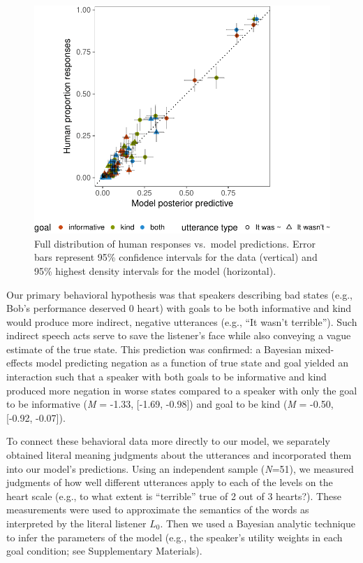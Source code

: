 \documentclass[12pt]{article}
\begin{document}

\begin{figure}
\centering
\includegraphics{polite_manuscript_files/figure-latex/variance-1.pdf}
\caption{\label{fig:variance}Full distribution of human responses vs.~model
predictions. Error bars represent 95\% confidence intervals for the data
(vertical) and 95\% highest density intervals for the model
(horizontal).}
\end{figure}

Our primary behavioral hypothesis was that speakers describing bad
states (e.g., Bob's performance deserved 0 heart) with goals to be both
informative and kind would produce more indirect, negative utterances
(e.g., \enquote{It wasn't terrible}). Such indirect speech acts serve to
save the listener's face while also conveying a vague estimate of the
true state. This prediction was confirmed: a Bayesian mixed-effects
model predicting negation as a function of true state and goal yielded
an interaction such that a speaker with both goals to be informative and
kind produced more negation in worse states compared to a speaker with
only the goal to be informative (\emph{M} = -1.33, {[}-1.69, -0.98{]})
and goal to be kind (\emph{M} = -0.50, {[}-0.92, -0.07{]}).

To connect these behavioral data more directly to our model, we
separately obtained literal meaning judgments about the utterances and
incorporated them into our model's predictions. Using an independent
sample (\emph{N}=51), we measured judgments of how well different
utterances apply to each of the levels on the heart scale (e.g., to what
extent is \enquote{terrible} true of 2 out of 3 hearts?). These
measurements were used to approximate the semantics of the words as
interpreted by the literal listener \(L_0\). 
Then we used a Bayesian analytic technique \cite{lee2014} 
to infer the parameters of
the model (e.g., the speaker's utility weights in each goal condition;
see Supplementary Materials).
\end{document}
